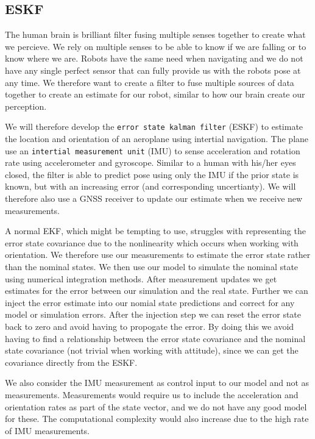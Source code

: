 \subsection{ESKF}
The human brain is brilliant filter fusing multiple senses together to create what we percieve. We rely on multiple senses to be able to know if we are falling or to know where we are. 
Robots have the same need when navigating and we do not have any single perfect sensor that can fully provide us with the robots pose at any time. We therefore want to create a filter to fuse multiple sources of data together to create an estimate for our robot, similar to how our brain create our perception.

We will therefore develop the \texttt{error state kalman filter} (ESKF) to estimate the location and orientation of an aeroplane using intertial navigation. The plane use an \texttt{intertial measurement unit} (IMU) to sense acceleration and rotation rate using accelerometer and gyroscope. Similar to a human with his/her eyes closed, the filter is able to predict pose using only the IMU if the prior state is known, but with an increasing error (and corresponding uncertianty). We will therefore also use a GNSS receiver to update our estimate when we receive new measurements. 

A normal EKF, which might be tempting to use, struggles with representing the error state covariance due to the nonlinearity which occurs when working with orientation. We therefore use our measurements to estimate the error state rather than the nominal states. We then use our model to simulate the nominal state using numerical integration methods. After measurement updates we get estimates for the error between our simulation and the real state. Further we can inject the error estimate into our nomial state predictions and correct for any model or simulation errors. After the injection step we can reset the error state back to zero and avoid having to propogate the error. By doing this we avoid having to find a relationship between the error state covariance and the nominal state covariance (not trivial when working with attitude), since we can get the covariance directly from the ESKF. 

We also consider the IMU measurement as control input to our model and not as measurements. Measurements would require us to include the acceleration and orientation rates as part of the state vector, and we do not have any good model for these. The computational complexity would also increase due to the high rate of IMU measurements.